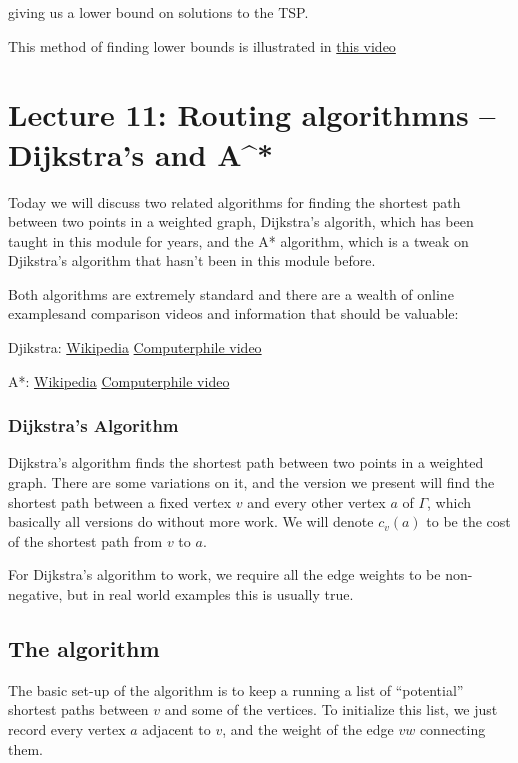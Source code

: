 \documentclass[]{article}
\begin{document}
giving us a lower bound on solutions to the TSP.

This method of finding lower bounds is illustrated in
\href{https://www.youtube.com/watch?v=NA2RToI4-ro}{this video}

\section{Lecture 11: Routing algorithmns -- Dijkstra's and A^*}

Today we will discuss two related algorithms for finding the shortest
path between two points in a weighted graph, Dijkstra's algorith, which
has been taught in this module for years, and the A* algorithm, which is
a tweak on Djikstra's algorithm that hasn't been in this module before.

Both algorithms are extremely standard and there are a wealth of online
examplesand comparison videos and information that should be valuable:

Djikstra:
\href{https://en.wikipedia.org/wiki/Dijkstra's_algorithm}{Wikipedia}
\href{https://www.youtube.com/watch?v=GazC3A4OQTE}{Computerphile video}

A*: \href{https://en.wikipedia.org/wiki/A*_search_algorithm}{Wikipedia}
\href{https://www.youtube.com/watch?v=ySN5Wnu88nE}{Computerphile video}

\subsubsection{Dijkstra's Algorithm}\label{dijkstras-algorithm}

Dijkstra's algorithm finds the shortest path between two points in a
weighted graph. There are some variations on it, and the version we
present will find the shortest path between a fixed vertex \(v\) and
every other vertex \(a\) of \(\Gamma\), which basically all versions do
without more work. We will denote \(c_v(a)\) to be the cost of the
shortest path from \(v\) to \(a\).

For Dijkstra's algorithm to work, we require all the edge weights to be
non-negative, but in real world examples this is usually true.

\subsection{The algorithm}\label{the-algorithm}

The basic set-up of the algorithm is to keep a running a list of
``potential'' shortest paths between \(v\) and some of the vertices. To
initialize this list, we just record every vertex \(a\) adjacent to
\(v\), and the weight of the edge \(vw\) connecting them.
\end{document}
